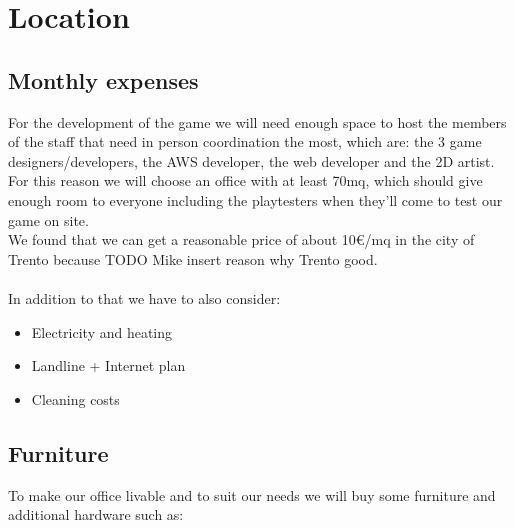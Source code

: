 \section{Location}
\label{section:location}

\subsection{Monthly expenses}
For the development of the game we will need enough space to host the members of the staff that need in person coordination the most, which are: the 3 game designers/developers, the AWS developer, the web developer and the 2D artist. For this reason we will choose an office with at least 70mq, which should give enough room to everyone including the playtesters when they'll come to test our game on site. \\
We found that we can get a reasonable price of about 10€/mq in the city of Trento because TODO Mike insert reason why Trento good. \\\\
In addition to that we have to also consider:
\begin{itemize}
	\item Electricity and heating
	\item Landline + Internet plan
	\item Cleaning costs
\end{itemize}


\subsection{Furniture}

To make our office livable and to suit our needs we will buy some furniture and additional hardware such as:

